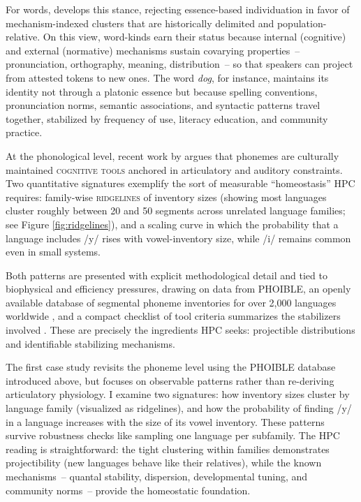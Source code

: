 \documentclass[12pt]{article}
\begin{document}
For words, \citet{Miller2021WordsSpeciesKinds} develops this stance, rejecting essence-based individuation in favor of mechanism-indexed clusters that are historically delimited and population-relative. On this view, word-kinds earn their status because internal (cognitive) and external (normative) mechanisms sustain covarying properties~-- pronunciation, orthography, meaning, distribution~-- so that speakers can project from attested tokens to new ones. The word \textit{dog}, for instance, maintains its identity not through a platonic essence but because spelling conventions, pronunciation norms, semantic associations, and syntactic patterns travel together, stabilized by frequency of use, literacy education, and community practice.

At the phonological level, recent work by \citet{Ekstrom2025PhonemeTool} argues that phonemes are culturally maintained \textsc{cognitive tools} anchored in articulatory and auditory constraints. Two quantitative signatures exemplify the sort of measurable \enquote{homeostasis} HPC requires: family-wise \textsc{ridgelines} of inventory sizes (showing most languages cluster roughly between 20 and 50 segments across unrelated language families; see Figure \ref{fig:ridgelines}), and a scaling curve in which the probability that a language includes /y/ rises with vowel-inventory size, while /i/ remains common even in small systems.

Both patterns are presented with explicit methodological detail and tied to biophysical and efficiency pressures, drawing on data from PHOIBLE, an openly available database of segmental phoneme inventories for over 2{,}000 languages worldwide \citep{MoranEtAl2019PHOIBLE}, and a compact checklist of tool criteria summarizes the stabilizers involved \citep[Fig.\,1 p.\,4; Fig.\,2 p.\,7; Table\,1 p.\,14]{Ekstrom2025PhonemeTool}. These are precisely the ingredients HPC seeks: projectible distributions and identifiable stabilizing mechanisms.

The first case study revisits the phoneme level using the PHOIBLE database introduced above, but focuses on observable patterns rather than re-deriving articulatory physiology. I examine two signatures: how inventory sizes cluster by language family (visualized as ridgelines), and how the probability of finding /y/ in a language increases with the size of its vowel inventory. These patterns survive robustness checks like sampling one language per subfamily. The HPC reading is straightforward: the tight clustering within families demonstrates projectibility (new languages behave like their relatives), while the known mechanisms~-- quantal stability, dispersion, developmental tuning, and community norms~-- provide the homeostatic foundation.
\end{document}
